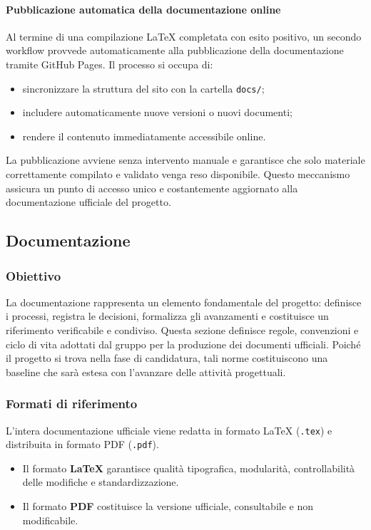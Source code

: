 \documentclass[a4paper, 11pt, oneside]{scrartcl} %
\begin{document}
\paragraph{Pubblicazione automatica della documentazione online}

Al termine di una compilazione \LaTeX{} completata con esito positivo, un secondo workflow provvede automaticamente alla pubblicazione della documentazione tramite GitHub Pages.
Il processo si occupa di:

\begin{itemize}
    \item sincronizzare la struttura del sito con la cartella \texttt{docs/};
\item includere automaticamente nuove versioni o nuovi documenti;
    \item rendere il contenuto immediatamente accessibile online.
\end{itemize}

La pubblicazione avviene senza intervento manuale e garantisce che solo materiale correttamente compilato e validato venga reso disponibile.
Questo meccanismo assicura un punto di accesso unico e costantemente aggiornato alla documentazione ufficiale del progetto.

\subsection{Documentazione}

\subsubsection{Obiettivo}
La documentazione rappresenta un elemento fondamentale del progetto:  
definisce i processi, registra le decisioni, formalizza gli avanzamenti e costituisce un riferimento verificabile e condiviso.
Questa sezione definisce regole, convenzioni e ciclo di vita{\scriptsize{}} adottati dal gruppo per la produzione dei documenti ufficiali.
Poiché il progetto si trova nella fase di candidatura, tali norme costituiscono una baseline che sarà estesa con l’avanzare delle attività progettuali.
\subsubsection{Formati di riferimento}
L'intera documentazione ufficiale viene redatta in formato \LaTeX{}{\scriptsize{}} (\texttt{.tex}) e distribuita in formato PDF{\scriptsize{}} (\texttt{.pdf}).
\begin{itemize}
    \item Il formato \textbf{\LaTeX{}} garantisce qualità tipografica, modularità, controllabilità delle modifiche e standardizzazione.
\item Il formato \textbf{PDF} costituisce la versione ufficiale, consultabile e non modificabile.
\end{itemize}
\end{document}
